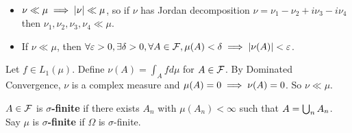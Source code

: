 \documentclass{article}
\begin{document}
\begin{rmks}~
  \begin{itemize}
    \item $\nu \ll \mu \implies \left\lvert \nu\right\rvert \ll \mu$, so if $\nu$ has Jordan decomposition $\nu = \nu_1 - \nu_2 + i\nu_3 - i\nu_4$ then $\nu_1, \nu_2, \nu_3, \nu_4 \ll \mu$.
    \item If $\nu \ll \mu$, then $\forall \varepsilon > 0, \exists \delta > 0, \forall A \in \mathcal F, \mu(A) < \delta \implies \left\lvert \nu(A)\right\rvert < \varepsilon$.
  \end{itemize}
\end{rmks}

\begin{eg*}
  Let $f \in L_1(\mu)$. Define $\nu(A) = \int_A f d\mu$ for $A \in \mathcal F$. By Dominated Convergence, $\nu$ is a complex measure and $\mu(A) = 0 \implies \nu(A) = 0$. So $\nu \ll \mu$.
\end{eg*}

\begin{dfn*}
  $A \in \mathcal F$ is {\bf $\sigma$-finite} if there exists $A_n$ with $\mu(A_n) < \infty$ such that $A = \bigcup_n A_n$. Say $\mu$ is {\bf $\sigma$-finite} if $\Omega$ is $\sigma$-finite.
\end{dfn*}
\end{document}
